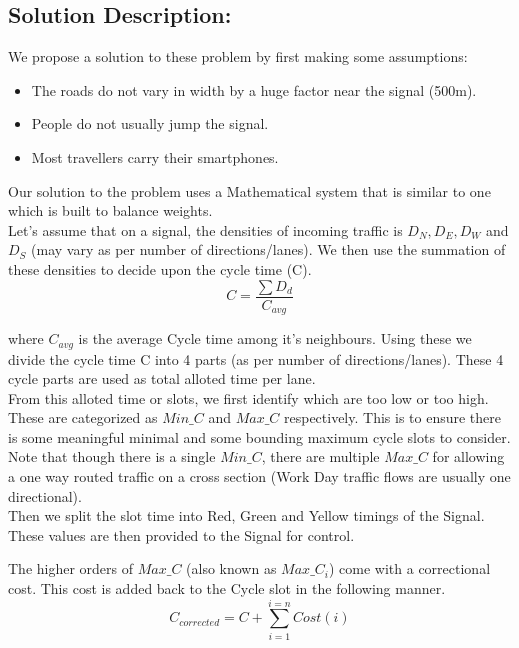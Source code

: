 \documentclass[12pt,a4paper,final]{report}
\begin{document}
\subsection{Solution Description:}
	We propose a solution to these problem by first making some assumptions:
	\begin{itemize}
		\item The roads do not vary in width by a huge factor near the signal (500m).
		\item People do not usually jump the signal.
		\item Most travellers carry their smartphones.
	\end{itemize}
		
	Our solution to the problem uses a Mathematical system that is similar to one which is built to balance weights.\\
		
	Let's assume that on a signal, the densities of incoming traffic is $D_{N}, D_{E}, D_{W}$ and $D_{S}$ (may vary as per number of directions/lanes).
	We then use the summation of these densities to decide upon the cycle time (C).\\
\begin{equation}
	C = \frac{\sum D_{d}}{C_{avg}}
\end{equation}

			where $C_{avg}$ is the average Cycle time among it's neighbours.
	Using these we divide the cycle time C into 4 parts (as per number of directions/lanes). These 4 cycle parts are used as total alloted time per lane.\\
		
	From this alloted time or slots, we first identify which are too low or too high. These are categorized as $Min\_C$ and $Max\_C$ respectively. This is to ensure there is some meaningful minimal and some bounding maximum cycle slots to consider. Note that though there is a single $Min\_C$, there are multiple $Max\_C$ for allowing a one way routed traffic on a cross section (Work Day traffic flows are usually one directional).\\
		
	Then we split the slot time into Red, Green and Yellow timings of the Signal. These values are then provided to the Signal for control.
		
	The higher orders of $Max\_C$ (also known as $Max\_C_{i}$) come with a correctional cost. This cost is added back to the Cycle slot in the following manner.\\
	\begin{equation}
			C_{corrected} = C + \sum_{i = 1}^{i = n} Cost(i)
	\end{equation}
			
\end{document}
